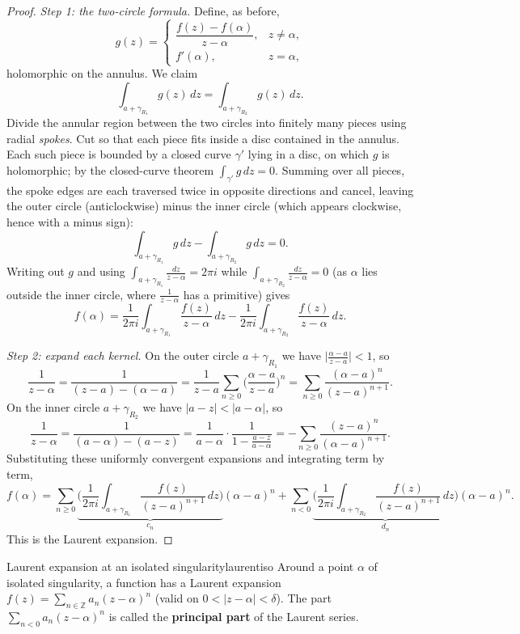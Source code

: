 \documentclass[11pt,openany]{report}
\newcommand{\Z}{\mathbb{Z}}
\newcommand{\abs}[1]{\left\lvert #1 \right\rvert}
\begin{document}
\begin{proof}
\emph{Step 1: the two-circle formula.} Define, as before,
\[
  g(z) =
  \begin{cases}
    \dfrac{f(z)-f(\alpha)}{z-\alpha}, & z\ne\alpha,\\[8pt]
    f'(\alpha), & z=\alpha,
  \end{cases}
\]
holomorphic on the annulus. We claim
\[
  \int_{a+\gamma_{R_1}} g(z)\,dz = \int_{a+\gamma_{R_2}} g(z)\,dz .
\]
Divide the annular region between the two circles into finitely many pieces using radial
\emph{spokes}. Cut so that each piece fits inside a disc contained in the annulus. Each
such piece is bounded by a closed curve $\gamma'$ lying in a disc, on which $g$ is
holomorphic; by the closed-curve theorem $\int_{\gamma'} g\,dz=0$. Summing over all pieces,
the spoke edges are each traversed twice in opposite directions and cancel, leaving the
outer circle (anticlockwise) minus the inner circle (which appears clockwise, hence with a
minus sign):
\[
  \int_{a+\gamma_{R_1}} g\,dz - \int_{a+\gamma_{R_2}} g\,dz = 0 .
\]
Writing out $g$ and using $\displaystyle\int_{a+\gamma_{R_1}}\frac{dz}{z-\alpha}=2\pi i$
while $\displaystyle\int_{a+\gamma_{R_2}}\frac{dz}{z-\alpha}=0$ (as $\alpha$ lies outside
the inner circle, where $\frac{1}{z-\alpha}$ has a primitive) gives
\[
  \boxed{\ f(\alpha) = \frac{1}{2\pi i}\int_{a+\gamma_{R_1}}\frac{f(z)}{z-\alpha}\,dz
            - \frac{1}{2\pi i}\int_{a+\gamma_{R_2}}\frac{f(z)}{z-\alpha}\,dz.\ }
\]

\emph{Step 2: expand each kernel.} On the outer circle $a+\gamma_{R_1}$ we have
$\bigl\lvert\frac{\alpha-a}{z-a}\bigr\rvert<1$, so
\[
  \frac{1}{z-\alpha} = \frac{1}{(z-a)-(\alpha-a)}
  = \frac{1}{z-a}\sum_{n\ge0}\Big(\frac{\alpha-a}{z-a}\Big)^n
  = \sum_{n\ge0}\frac{(\alpha-a)^n}{(z-a)^{n+1}} .
\]
On the inner circle $a+\gamma_{R_2}$ we have $\abs{a-z}<\abs{a-\alpha}$, so
\[
  \frac{1}{z-\alpha} = \frac{1}{(a-\alpha)-(a-z)}
  = \frac{1}{a-\alpha}\cdot\frac{1}{1-\frac{a-z}{a-\alpha}}
  = -\sum_{n\ge0}\frac{(z-a)^n}{(\alpha-a)^{n+1}} .
\]
Substituting these uniformly convergent expansions and integrating term by term,
\[
  f(\alpha) = \sum_{n\ge0}\underbrace{\Big(\frac{1}{2\pi i}\int_{a+\gamma_{R_1}}\frac{f(z)}{(z-a)^{n+1}}\,dz\Big)}_{c_n}(\alpha-a)^n
  + \sum_{n<0}\underbrace{\Big(\frac{1}{2\pi i}\int_{a+\gamma_{R_2}}\frac{f(z)}{(z-a)^{n+1}}\,dz\Big)}_{d_n}(\alpha-a)^n .
\]
This is the Laurent expansion.
\end{proof}

\begin{corollary}{Laurent expansion at an isolated singularity}{laurentiso}
Around a point $\alpha$ of isolated singularity, a function has a Laurent expansion
$f(z)=\sum_{n\in\Z} a_n(z-\alpha)^n$ (valid on $0<\abs{z-\alpha}<\delta$). The part
$\displaystyle\sum_{n<0} a_n(z-\alpha)^n$ is called the \textbf{principal part} of the
Laurent series.
\end{corollary}
\end{document}
